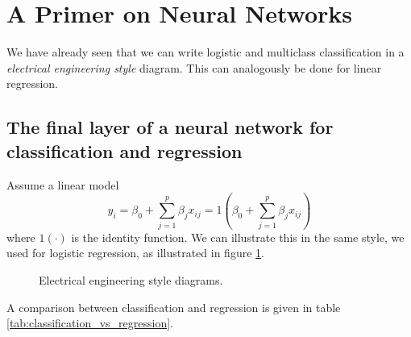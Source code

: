 \section{A Primer on Neural Networks\skipthis}
\thispagestyle{plain}

We have already seen that we can write logistic and multiclass
classification in a \textit{electrical engineering style} diagram.
This can analogously be done for linear regression.

\subsection{The final layer of a neural network for classification and regression}
Assume a linear model
\begin{equation}
    \hat{y}_i = \beta_0 + \sum_{j=1}^{p} \beta_j x_{ij} = 1( \beta_0 + \sum_{j=1}^{p} \beta_j x_{ij} )
\end{equation}
where $1(\cdot)$ is the identity function. We can illustrate this in the same
style, we used for logistic regression, as illustrated in figure
\ref{fig:lin_class_electrical}.

\begin{figure}[!htb]
    \centering
    
    \caption{Electrical engineering style diagrams.}
    \label{fig:lin_class_electrical}
\end{figure}

A comparison between classification and regression is given in table \ref{tab:classification_vs_regression}.

